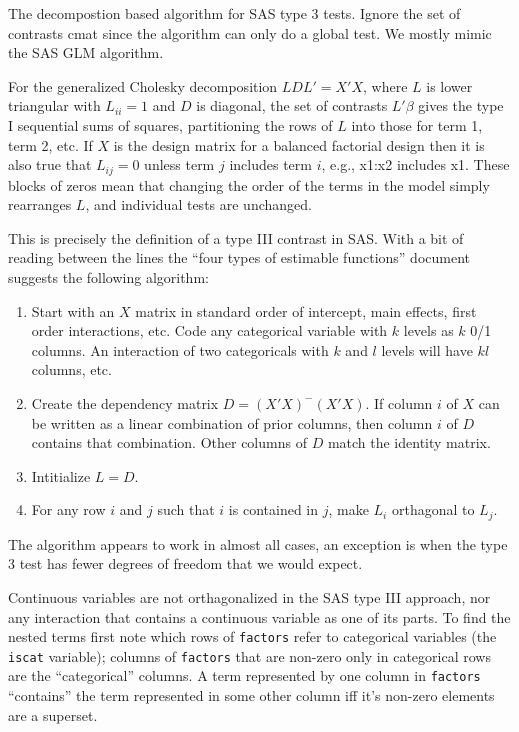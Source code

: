 \documentclass{article}
\newcommand{\code}[1]{\texttt{#1}}
\begin{document}
The decompostion based algorithm for SAS type 3 tests.
Ignore the set of contrasts cmat since the algorithm can only
do a global test.
We mostly mimic the SAS GLM algorithm.

For the generalized Cholesky decomposition $LDL' = X'X$, where $L$ is
lower triangular with $L_{ii}=1$ and $D$ is diagonal, the set of contrasts
$L'\beta$ gives the type I sequential sums of squares, partitioning the
rows of $L$ into those for term 1, term 2, etc.
If $X$ is the design matrix for a balanced factorial design then it is
also true that $L_{ij}=0$ unless term $j$ includes term $i$, e.g., x1:x2
includes x1. These blocks of zeros mean that changing the order of the terms
in the model simply rearranges $L$, and individual tests are unchanged.

This is precisely the definition of a type III contrast in SAS.
With a bit of reading between the lines the ``four types of estimable
functions'' document suggests the following algorithm:
\begin{enumerate}
  \item Start with an $X$ matrix in standard order of intercept, main effects,
   first order interactions, etc.  Code any categorical variable with $k$ levels
   as $k$ 0/1 columns.  An interaction of two categoricals with $k$ and $l$
   levels will have $kl$ columns, etc.
 \item Create the dependency matrix $D = (X'X)^-(X'X)$.  If column $i$ of $X$
   can be written as a linear combination of prior columns, then column $i$ of
   $D$ contains that combination.  Other columns of $D$ match the identity
   matrix.
 \item Intitialize $L = D$.
 \item For any row $i$ and $j$ such that $i$ is contained in $j$, make $L_i$
   orthagonal to $L_j$.
\end{enumerate}
The algorithm appears to work in almost all cases, an exception is when the
type 3 test has fewer degrees of freedom that we would expect.

Continuous variables are not orthagonalized in the SAS type III approach,
nor any interaction that contains a continuous variable as one of its parts.
To find the nested terms first note which rows of \code{factors} refer
to categorical variables (the \code{iscat} variable);
columns of \code{factors} that are non-zero only
in categorical rows are the ``categorical'' columns.
A term represented by one column in \code{factors} ``contains'' the term 
represented in some other column iff it's non-zero elements are a superset.
\end{document}
